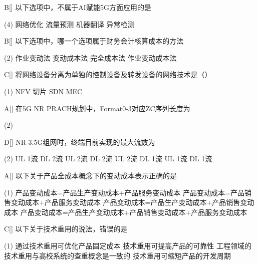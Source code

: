 \begin{choice}{B}[]
	以下选项中，不属于AI赋能5G方面应用的是
	\begin{tasks}(4)
		\task 网络优化
		\task 流量预测
		\task 机器翻译
		\task 异常检测
	\end{tasks}
\end{choice}

\begin{choice}{B}[]
	以下选项中，哪一个选项属于财务会计核算成本的方法
	\begin{tasks}(2)
		\task 作业变动法
		\task 变动成本法
		\task 完全成本法
		\task 作业变动成本法
	\end{tasks}
\end{choice}


\begin{choice}{C}[]
	将网络设备分离为单独的控制设备及转发设备的网络技术是（）
	\begin{tasks}(1)
		\task NFV
		\task 切片
		\task SDN
		\task MEC
	\end{tasks}
\end{choice}


\begin{choice}{A}[]
	在5G NR PRACH规划中，Format0-3对应ZC序列长度为
	\begin{tasks}(2)
	\end{tasks}
\end{choice}



\begin{choice}{D}[]
	NR 3.5G组网时，终端目前实现的最大流数为
	\begin{tasks}(2)
		\task UL 1流 DL 2流
		\task UL 2流 DL 2流
		\task UL 2流 DL 1流
		\task UL 1流 DL 1流
	\end{tasks}
\end{choice}


\begin{choice}{A}[]
	以下关于产品全成本概念下的变动成本表示正确的是
	\begin{tasks}(1)
		\task 产品变动成本=产品生产变动成本+产品服务变动成本
		\task 产品变动成本=产品销售变动成本+产品服务变动成本
		\task 产品变动成本=产品生产变动成本+产品销售变动成本
		\task 产品变动成本=产品生产变动成本+产品销售变动成本+产品服务变动成本
	\end{tasks}
\end{choice}


\begin{choice}{C}[]
	以下关于技术重用的说法，错误的是
	\begin{tasks}(1)
		\task 通过技术重用可优化产品固定成本
		\task  技术重用可提高产品的可靠性
		\task 工程领域的技术重用与高校系统的查重概念是一致的
		\task 技术重用可缩短产品的开发周期
	\end{tasks}
\end{choice}


